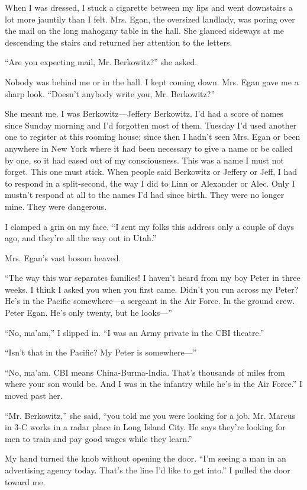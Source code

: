 \documentclass{novel}
\begin{document}
When I was dressed, I stuck a cigarette between my lips and went downstairs a lot more jauntily than I felt. Mrs. Egan, the oversized landlady, was poring over the mail on the long mahogany table in the hall. She glanced sideways at me descending the stairs and returned her attention to the letters.

“Are you expecting mail, Mr. Berkowitz?” she asked.

Nobody was behind me or in the hall. I kept coming down. Mrs. Egan gave me a sharp look. “Doesn’t anybody write you, Mr. Berkowitz?”

She meant me. I was Berkowitz—Jeffery Berkowitz. I’d had a score of names since Sunday morning and I’d forgotten most of them. Tuesday I’d used another one to register at this rooming house; since then I hadn’t seen Mrs. Egan or been anywhere in New York where it had been necessary to give a name or be called by one, so it had eased out of my consciousness. This was a name I must not forget. This one must stick. When people said Berkowitz or Jeffery or Jeff, I had to respond in a split-second, the way I did to Linn or Alexander or Alec. Only I mustn’t respond at all to the names I’d had since birth. They were no longer mine. They were dangerous.

I clamped a grin on my face. “I sent my folks this address only a couple of days ago, and they’re all the way out in Utah.”

Mrs. Egan’s vast bosom heaved.

“The way this war separates families! I haven’t heard from my boy Peter in three weeks. I think I asked you when you first came. Didn’t you run across my Peter? He’s in the Pacific somewhere—a sergeant in the Air Force. In the ground crew. Peter Egan. He’s only twenty, but he looks—”

“No, ma’am,” I slipped in. “I was an Army private in the CBI theatre.”

“Isn’t that in the Pacific? My Peter is somewhere—”

“No, ma’am. CBI means China-Burma-India. That’s thousands of miles from where your son would be. And I was in the infantry while he’s in the Air Force.” I moved past her.

“Mr. Berkowitz,” she said, “you told me you were looking for a job. Mr. Marcus in 3-C works in a radar place in Long Island City. He says they’re looking for men to train and pay good wages while they learn.”

My hand turned the knob without opening the door. “I’m seeing a man in an advertising agency today. That’s the line I’d like to get into.” I pulled the door toward me.
\end{document}
